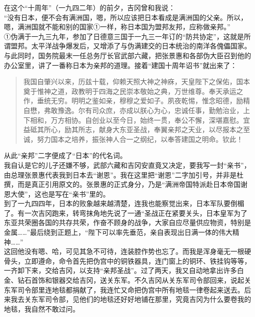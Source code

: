 在这个“十周年”（一九四二年）的前夕，吉冈曾和我说：\\

“没有日本，便不会有满洲国，嗯，所以应该把日本看成是满洲国的父亲。所以，嗯，满洲国就不能和别的国家①一样，称日本国为盟邦友邦，应称做亲邦。”\\

①伪满于一九三九年，参加了日德意三国于一九三一年订的“防共协定”，这就是所谓盟邦。太平洋战争爆发后，又增添了与伪满建交的日本统治的南洋各傀儡国家。\\

与此同时，国务院最末一任总务厅长官武部六藏，把张景惠和各部伪大臣召到他的办公室里，讲了一番称日本为亲邦的道理。接着“建国十周年诏书”就出来了：\\

\begin{quote}
	我国自肇兴以来，历兹十载，仰赖天照大神之神庥，天皇陛下之保佑，国本奠于惟神之道，政教明于四海之民崇本敬始之典，万世维尊。奉天承运之作，垂统无穷。明明之鉴如亲，穆穆之爱如子。夙夜乾惕，惟念昭德，励精自懋，弗敢豫逸。尔有司众庶，亦成以朕心为心，忠诚任事，勤勉治业，上下相和，万方相协。自创业以至今日，始终一贯，奉公不懈，深堪嘉慰。宜益砥其所心，励其所志，献身大东亚圣战，奉翼亲邦之天业，以尽报本之至诚，努力国本之培养，振张神人合一之纲纪，以奉答建国之明命。钦此！
\end{quote}

从此“亲邦”二字便成了“日本”的代名词。\\

我自认是它的儿子还嫌不够，武部六藏和吉冈安直竟又决定，要我写一封“亲书”，由总理张景惠代表我到日本去“谢恩”。我在这里把“谢恩”二字加引号，并非是杜撰，而是真正引用原文的。张景惠的正式身分，乃是“满洲帝国特派赴日本帝国谢恩大使”，这也是写在“亲书”里的。\\

到了一九四四年，日本的败象越来越清楚，连我也能察觉出来，日本军队要倒楣了。有一次吉冈跑来，转弯抹角地先说了一通“圣战正在紧要关头，日本皇军为了东亚共荣圈各国的共存共荣，作奋不顾身的战争，大家自应尽量供应物资，特别是金属……”最后绕到正题上，“陛下可以率先垂范，亲自表现出日满一体的伟大精神……”\\

这回他没有嗯、哈，可见其急不可待，连装腔作势也忘了。而我是浑身毫无一根硬骨头，立即遵命，命令首先把伪宫中的铜铁器具，连门窗上的铜环、铁挂钩等等，一齐卸下来，交给吉冈，以支持“亲邦圣战”。过了两天，我又自动地拿出许多白金、钻石首饰和银器交给吉冈，送关东军。不久吉冈从关东军司令部回来，说起关东军司令部里连地毯都捐献了，我连忙又命把伪宫中所有地毯一律卷起来送去。后来我去关东军司令部，见他们的地毯还好好地铺在那里，究竟吉冈为什么要卷我的地毯，我自然不敢过问。\\

